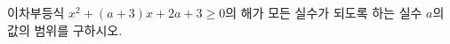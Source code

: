 \hspace*{2mm}\begin{minipage}[t]{\dimexpr\linewidth-2mm\relax}\vspace{0pt}
이차부등식 $x^2+(a+3)x+2a+3\ge 0$의 해가 모든 실수가 되도록 하는 실수 $a$의 값의 범위를 구하시오.\end{minipage}
